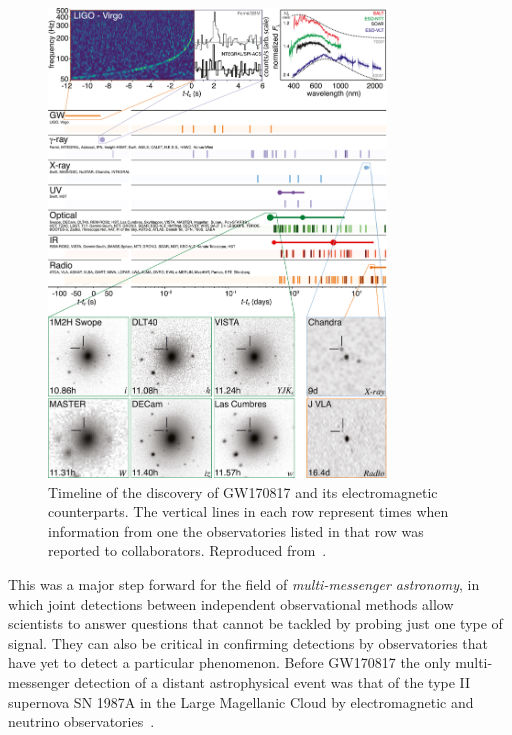 \begin{figure}
	\centering
	\includegraphics[width=0.8\textwidth]{figures/gw/gw170817.jpg}
	\caption[Timeline of the discovery of GW170817 and its electromagnetic counterparts.]{Timeline of the discovery of GW170817 and its electromagnetic counterparts. The vertical lines in each row represent times when information from one the observatories listed in that row was reported to collaborators. Reproduced from~\citet{gw170817_mma}.}
	\label{fig:mma-gw170817}
\end{figure}

This was a major step forward for the field of \textit{multi-messenger astronomy}, in which joint detections between independent observational methods allow scientists to answer questions that cannot be tackled by probing just one type of signal.
They can also be critical in confirming detections by observatories that have yet to detect a particular phenomenon.
Before GW170817 the only multi-messenger detection of a distant astrophysical event was that of the type II supernova SN 1987A in the Large Magellanic Cloud by electromagnetic and neutrino observatories~\citep{Hirata_1987, Bionta_1987, Alekseev_1988}.


